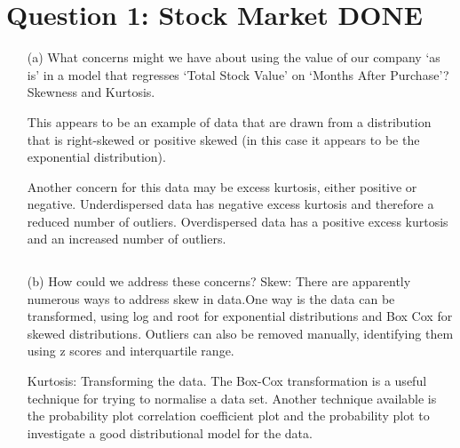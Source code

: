 \documentclass[12pt,letterpaper]{article}
\begin{document}
	\section*{Question 1: Stock Market DONE}
	\begin{enumerate}
		
		\item [(a)] What concerns might we have about using the value of our company ‘as is’ in a model that
		regresses 
		‘Total Stock Value’ on ‘Months After Purchase’?
		Skewness and Kurtosis. 
		
		This appears to be an example of data that are drawn from a distribution that is right-skewed or positive skewed (in this case it appears to be the exponential distribution). 
		
		
		Another concern for this data may be excess kurtosis, either positive or negative. Underdispersed data has negative excess kurtosis and therefore a reduced number of outliers. 
		Overdispersed data has a positive excess kurtosis and an increased number of outliers.
		
		\begin{verbatim}	
		\end{verbatim}
		
		\item [(b)]  How could we address these
		concerns?
		Skew: There are apparently numerous ways to address skew in data.One way is the data can be transformed, using log and root for exponential distributions and Box Cox for skewed distributions. Outliers can also be removed manually, identifying them using z scores and interquartile range.
		
		Kurtosis: Transforming the data. The Box-Cox transformation is a useful technique for trying to normalise a data set. Another technique available is the probability plot correlation coefficient plot and the probability plot to investigate a good distributional model for the data. 
		
	\end{enumerate}
	
	\newpage
	
\end{document}
